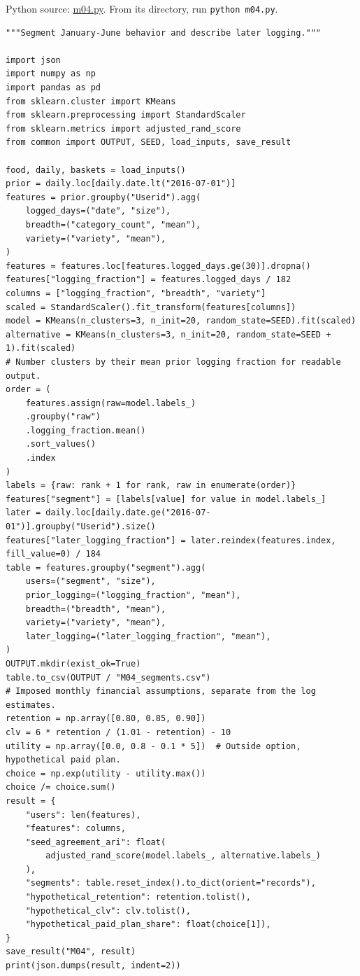 \FloatBarrier
{}
Python source:
\href{../03_Data_and_Code/mHealth/recurring_examples/m04.py}{m04.py}.
From its directory, run \texttt{python\ m04.py}.

\begin{Verbatim}[breaklines,breakanywhere,fontsize=\small]
"""Segment January-June behavior and describe later logging."""

import json
import numpy as np
import pandas as pd
from sklearn.cluster import KMeans
from sklearn.preprocessing import StandardScaler
from sklearn.metrics import adjusted_rand_score
from common import OUTPUT, SEED, load_inputs, save_result

food, daily, baskets = load_inputs()
prior = daily.loc[daily.date.lt("2016-07-01")]
features = prior.groupby("Userid").agg(
    logged_days=("date", "size"),
    breadth=("category_count", "mean"),
    variety=("variety", "mean"),
)
features = features.loc[features.logged_days.ge(30)].dropna()
features["logging_fraction"] = features.logged_days / 182
columns = ["logging_fraction", "breadth", "variety"]
scaled = StandardScaler().fit_transform(features[columns])
model = KMeans(n_clusters=3, n_init=20, random_state=SEED).fit(scaled)
alternative = KMeans(n_clusters=3, n_init=20, random_state=SEED + 1).fit(scaled)
# Number clusters by their mean prior logging fraction for readable output.
order = (
    features.assign(raw=model.labels_)
    .groupby("raw")
    .logging_fraction.mean()
    .sort_values()
    .index
)
labels = {raw: rank + 1 for rank, raw in enumerate(order)}
features["segment"] = [labels[value] for value in model.labels_]
later = daily.loc[daily.date.ge("2016-07-01")].groupby("Userid").size()
features["later_logging_fraction"] = later.reindex(features.index, fill_value=0) / 184
table = features.groupby("segment").agg(
    users=("segment", "size"),
    prior_logging=("logging_fraction", "mean"),
    breadth=("breadth", "mean"),
    variety=("variety", "mean"),
    later_logging=("later_logging_fraction", "mean"),
)
OUTPUT.mkdir(exist_ok=True)
table.to_csv(OUTPUT / "M04_segments.csv")
# Imposed monthly financial assumptions, separate from the log estimates.
retention = np.array([0.80, 0.85, 0.90])
clv = 6 * retention / (1.01 - retention) - 10
utility = np.array([0.0, 0.8 - 0.1 * 5])  # Outside option, hypothetical paid plan.
choice = np.exp(utility - utility.max())
choice /= choice.sum()
result = {
    "users": len(features),
    "features": columns,
    "seed_agreement_ari": float(
        adjusted_rand_score(model.labels_, alternative.labels_)
    ),
    "segments": table.reset_index().to_dict(orient="records"),
    "hypothetical_retention": retention.tolist(),
    "hypothetical_clv": clv.tolist(),
    "hypothetical_paid_plan_share": float(choice[1]),
}
save_result("M04", result)
print(json.dumps(result, indent=2))
\end{Verbatim}


